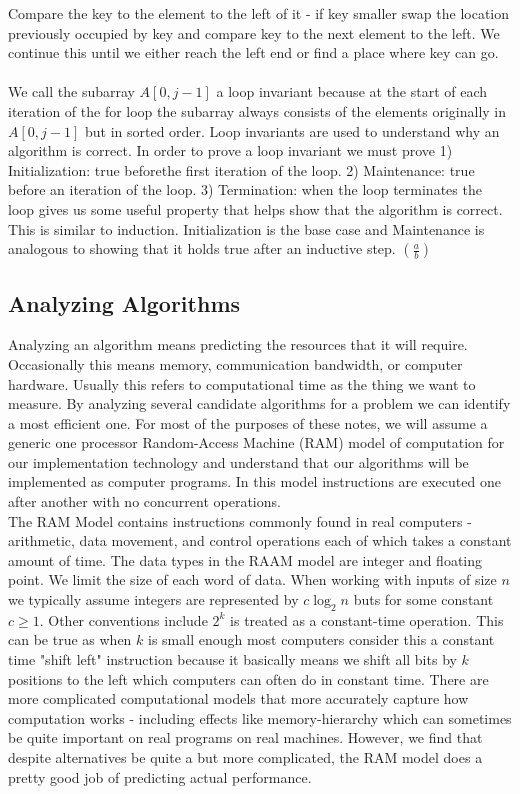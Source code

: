 \documentclass{scrartcl}
\theoremstyle{definition}
\theoremstyle{definition}
\theoremstyle{remark}
\numberwithin{equation}{section}
\begin{document}
Compare the key to the element to the left of it - if key smaller swap the location previously occupied by key and compare key to the next element to the left. We continue this until we either reach the left end or find a place where key can go. \\
\\
We call the subarray $A[0,j-1]$ a loop invariant because at the start of each iteration of the for loop the subarray always consists of the elements originally in $A[0,j-1]$ but in sorted order. Loop invariants are used to understand why an algorithm is correct. In order to prove a loop invariant we must prove 1) Initialization: true beforethe first iteration of the loop. 2) Maintenance: true before an iteration of the loop. 3) Termination: when the loop terminates the loop gives us some useful property that helps show that the algorithm is correct. This is similar to induction. Initialization is the base case and Maintenance is analogous to showing that it holds true after an inductive step.
$\left(\frac{a}{b}\right)$
\subsection{Analyzing Algorithms}
Analyzing an algorithm means predicting the resources that it will require. Occasionally this means memory, communication bandwidth, or computer hardware. Usually this refers to computational time as the thing we want to measure. By analyzing several candidate algorithms for a problem we can identify a most efficient one. For most of the purposes of these notes, we will assume a generic one processor Random-Access Machine (RAM) model of computation for our implementation technology and understand that our algorithms will be implemented as computer programs. In this model instructions are executed one after another with no concurrent operations. \\
The RAM Model contains instructions commonly found in real computers - arithmetic, data movement, and control operations each of which takes a constant amount of time. The data types in the RAAM model are integer and floating point. We limit the size of each word of data. When working with inputs of size $n$ we typically assume integers are represented by $c\log_2n$ buts for some constant $c\geq1$. Other conventions include $2^k$ is treated as a constant-time operation. This can be true as when $k$ is small enough most computers consider this a constant time "shift left" instruction because it basically means we shift all bits by $k$ positions to the left which computers can often do in constant time. There are more complicated computational models that more accurately capture how computation works - including effects like memory-hierarchy which can sometimes be quite important on real programs on real machines. However, we find that despite alternatives be quite a but more complicated, the RAM model does a pretty good job of predicting actual performance.
\end{document}
